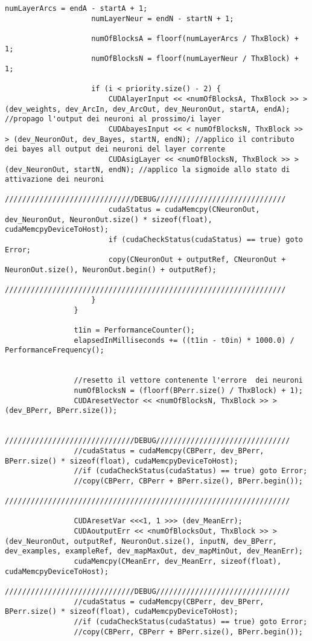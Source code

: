 \documentclass[10pt,a4paper]{article}
\begin{document}
\begin{lstlisting}[style=mycuda, caption=librerie usate, captionpos=b]
					numLayerArcs = endA - startA + 1;
					numLayerNeur = endN - startN + 1;

					numOfBlocksA = floorf(numLayerArcs / ThxBlock) + 1;
					numOfBlocksN = floorf(numLayerNeur / ThxBlock) + 1;

					if (i < priority.size() - 2) {
						CUDAlayerInput << <numOfBlocksA, ThxBlock >> > (dev_weights, dev_ArcIn, dev_ArcOut, dev_NeuronOut, startA, endA); //propago l'output dei neuroni al prossimo/i layer
						CUDAbayesInput << < numOfBlocksN, ThxBlock >> > (dev_NeuronOut, dev_Bayes, startN, endN); //applico il contributo dei bayes all output dei neuroni del layer corrente 
						CUDAsigLayer << <numOfBlocksN, ThxBlock >> > (dev_NeuronOut, startN, endN); //applico la sigmoide allo stato di attivazione dei neuroni
						//////////////////////////////DEBUG//////////////////////////////
						cudaStatus = cudaMemcpy(CNeuronOut, dev_NeuronOut, NeuronOut.size() * sizeof(float), cudaMemcpyDeviceToHost);
						if (cudaCheckStatus(cudaStatus) == true) goto Error;
						copy(CNeuronOut + outputRef, CNeuronOut + NeuronOut.size(), NeuronOut.begin() + outputRef);
						/////////////////////////////////////////////////////////////////
					}
				}

				t1in = PerformanceCounter();
				elapsedInMilliseconds += ((t1in - t0in) * 1000.0) / PerformanceFrequency();


				//resetto il vettore contenente l'errore  dei neuroni
				numOfBlocksN = (floorf(BPerr.size() / ThxBlock) + 1);
				CUDAresetVector << <numOfBlocksN, ThxBlock >> > (dev_BPerr, BPerr.size());

				//////////////////////////////DEBUG///////////////////////////////
				//cudaStatus = cudaMemcpy(CBPerr, dev_BPerr, BPerr.size() * sizeof(float), cudaMemcpyDeviceToHost);
				//if (cudaCheckStatus(cudaStatus) == true) goto Error;
				//copy(CBPerr, CBPerr + BPerr.size(), BPerr.begin());
				//////////////////////////////////////////////////////////////////

				CUDAresetVar <<<1, 1 >>> (dev_MeanErr);
				CUDAoutputErr << <numOfBlocksOut, ThxBlock >> > (dev_NeuronOut, outputRef, NeuronOut.size(), inputN, dev_BPerr, dev_examples, exampleRef, dev_mapMaxOut, dev_mapMinOut, dev_MeanErr);
				cudaMemcpy(CMeanErr, dev_MeanErr, sizeof(float), cudaMemcpyDeviceToHost);
				//////////////////////////////DEBUG///////////////////////////////
				//cudaStatus = cudaMemcpy(CBPerr, dev_BPerr, BPerr.size() * sizeof(float), cudaMemcpyDeviceToHost);
				//if (cudaCheckStatus(cudaStatus) == true) goto Error;
				//copy(CBPerr, CBPerr + BPerr.size(), BPerr.begin());


\end{lstlisting}
\end{document}
